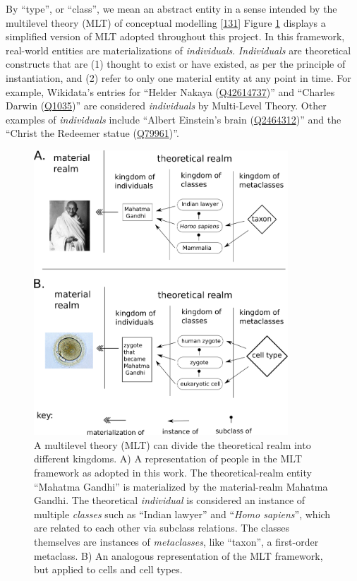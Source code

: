 By ``type'', or ``class'', we mean an abstract entity in a sense intended by the multilevel theory (MLT) of conceptual modelling {[}\protect\hyperlink{ref-eP47FILn}{131}{]}
Figure \ref{fig:multilevel} displays a simplified version of MLT adopted throughout this project.
In this framework, real-world entities are materializations of \emph{individuals}.
\emph{Individuals} are theoretical constructs that are (1) thought to exist or have existed, as per the principle of instantiation, and (2) refer to only one material entity at any point in time.
For example, Wikidata's entries for ``Helder Nakaya (\href{https://www.wikidata.org/wiki/Q42614737}{Q42614737})'' and ``Charles Darwin (\href{https://www.wikidata.org/wiki/Q42614737}{Q1035})'' are considered \emph{individuals} by Multi-Level Theory.
Other examples of \emph{individuals} include ``Albert Einstein's brain (\href{https://www.wikidata.org/wiki/Q2464312}{Q2464312})'' and the ``Christ the Redeemer statue (\href{https://www.wikidata.org/wiki/Q79961}{Q79961})''.

\begin{figure}
\hypertarget{fig:multilevel}{%
\centering
\includegraphics[width=0.85\textwidth,height=\textheight]{images/combination_human_cell.png}
\caption{A multilevel theory (MLT) can divide the theoretical realm into different kingdoms. A) A representation of people in the MLT framework as adopted in this work. The theoretical-realm entity ``Mahatma Gandhi'' is materialized by the material-realm Mahatma Gandhi. The theoretical \emph{individual} is considered an instance of multiple \emph{classes} such as ``Indian lawyer'' and ``\emph{Homo sapiens}'', which are related to each other via subclass relations. The classes themselves are instances of \emph{metaclasses}, like ``taxon'', a first-order metaclass. B) An analogous representation of the MLT framework, but applied to cells and cell types.}\label{fig:multilevel}
}
\end{figure}

